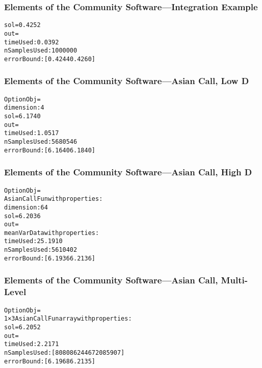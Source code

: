 \documentclass[11pt,compress,xcolor={usenames,dvipsnames},aspectratio=169]{beamer}
\begin{document}
\begin{frame}[fragile]
\frametitle{Elements of the Community Software---Integration Example}
\vspace{-5ex}


\begin{alltt}
sol = 0.4252
out = 
timeUsed: 0.0392
nSamplesUsed: 1000000
errorBound: [0.4244 0.4260]
\end{alltt}
\end{frame}


\begin{frame}[fragile]
\frametitle{Elements of the Community Software---Asian Call, Low D}
\vspace{-5ex}


\begin{alltt}
OptionObj = 
dimension: 4
sol = 6.1740
out = 
timeUsed: 1.0517
nSamplesUsed: 5680546
errorBound: [6.1640 6.1840]
\end{alltt}
\end{frame}


\begin{frame}[fragile]
\frametitle{Elements of the Community Software---Asian Call, High D}
\vspace{-5ex}


\begin{alltt}
OptionObj = 
AsianCallFun with properties:
dimension: 64
sol =6.2036
out = 
meanVarData with properties:
timeUsed: 25.1910
nSamplesUsed: 5610402
errorBound: [6.1936 6.2136]
\end{alltt}
\end{frame}


\begin{frame}[fragile]
\frametitle{Elements of the Community Software---Asian Call, Multi-Level}
\vspace{-5ex}


\begin{alltt}
OptionObj = 
1×3 AsianCallFun array with properties:
sol = 6.2052
out = 
timeUsed: 2.2171
nSamplesUsed: [8080862 446720 85907]
errorBound: [6.1968 6.2135]
\end{alltt}
\end{frame}









\thankyouframe

\printbibliography
\end{document}
